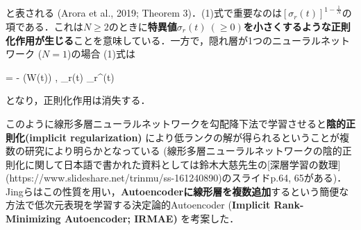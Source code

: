 と表される (Arora et al., 2019; Theorem 3)．(1)式で重要なのは$\left[\sigma_r(t)\right]^{1 - \frac{1}{N}}$の項である．これは$N\geq 2$のときに\textbf{特異値$\sigma_r(t)\ (\geq 0)$を小さくするような正則化作用が生じる}ことを意味している．一方で，隠れ層が1つのニューラルネットワーク ($N=1$)の場合 (1)式は


 = - \left\langle \nabla {}(W(t)) , _r(t) _r^\top(t) \right\rangle


となり，正則化作用は消失する．

このように線形多層ニューラルネットワークを勾配降下法で学習させると\textbf{陰的正則化(implicit regularization)} により低ランクの解が得られるということが複数の研究により明らかとなっている (線形多層ニューラルネットワークの陰的正則化に関して日本語で書かれた資料としては鈴木大慈先生の[深層学習の数理](https://www.slideshare.net/trinmu/ss-161240890)のスライドp.64, 65がある)．Jingらはこの性質を用い，\textbf{Autoencoderに線形層を複数追加}するという簡便な方法で低次元表現を学習する決定論的Autoencoder (\textbf{Implicit Rank-Minimizing Autoencoder; IRMAE)} を考案した．
